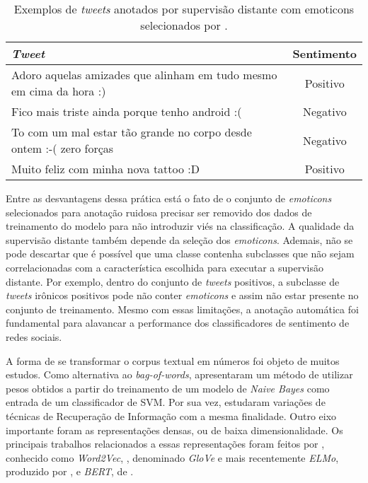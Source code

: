 \begin{table}[h]
    \begin{center}
        \begin{tabular}{| p{10cm} | c |}
        \hline
        \textbf{\textit{Tweet}} & \textbf{Sentimento} \\ \hline
        Adoro aquelas amizades que alinham em tudo mesmo em cima da hora :) & Positivo \\ \hline
        Fico mais triste ainda porque tenho android :( & Negativo\\ \hline
        To com um mal estar tão grande no corpo desde ontem :-( zero forças & Negativo\\ \hline
        Muito feliz com minha nova tattoo :D & Positivo \\ \hline
        \end{tabular}
        \caption{Exemplos de \textit{tweets} anotados por supervisão distante
        com emoticons selecionados por \citet{go09}.}
        \label{tab:supervision_tweets}
    \end{center}
\end{table}

Entre as desvantagens dessa prática está o fato de o conjunto de
\textit{emoticons} selecionados para anotação ruidosa precisar ser removido
dos dados de treinamento do modelo para não introduzir viés na classificação.
A qualidade da supervisão distante também depende da seleção dos
\textit{emoticons}.
Ademais, não se pode descartar que é possível que uma classe contenha subclasses que
não sejam correlacionadas com a característica escolhida para executar a
supervisão distante.
Por exemplo, dentro do conjunto de \textit{tweets} positivos, a subclasse de
\textit{tweets} irônicos positivos pode não conter \textit{emoticons} e assim
não estar presente no conjunto de treinamento.
Mesmo com essas limitações, a anotação automática foi fundamental para alavancar
a performance dos classificadores de sentimento de redes sociais.


A forma de se transformar o corpus textual em números foi objeto de muitos
estudos.
Como alternativa ao \textit{bag-of-words}, \citet{wang12} apresentaram um método
de utilizar pesos obtidos a partir do treinamento de um modelo de
\textit{Naive Bayes} como entrada de um classificador de SVM.
Por sua vez, \citet{paltoglou10} estudaram variações de técnicas de Recuperação
de Informação com a mesma finalidade.
Outro eixo importante foram as representações densas, ou de baixa
dimensionalidade.
Os principais trabalhos relacionados a essas representações foram feitos por
\citet{mikolov13}, conhecido como \textit{Word2Vec}, \citet{pennington14},
denominado \textit{GloVe} e mais recentemente \textit{ELMo}, produzido por
\citet{peters18}, e \textit{BERT}, de \citet{devlin18}.

